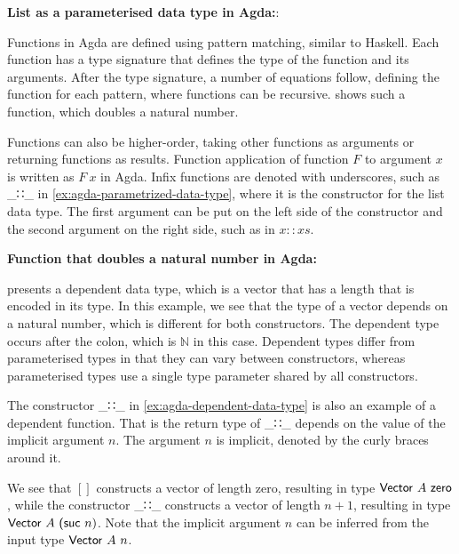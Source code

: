 \begin{example}
  \label{ex:agda-parametrized-data-type}
  \textbf{List as a parameterised data type in Agda:}:
  
\end{example}
Functions in Agda are defined using pattern matching, similar to Haskell. 
Each function has a type signature that defines the type of the function and its arguments.
After the type signature, a number of equations follow, defining the function for each pattern,
where functions can be recursive.  shows such a function, which doubles a natural number.

Functions can also be higher-order, taking other functions as arguments or returning functions as results.
Function application of function $F$ to argument $x$ is written as $F \ x$ in Agda.
Infix functions are denoted with underscores, such as \textsf{\_∷\_} in \cref{ex:agda-parametrized-data-type}, where it is the constructor for the list data type.
The first argument can be put on the left side of the constructor and the second argument on the right side, such as in $x :: xs$.

\begin{example}
  \label{ex:agda-function}
  \textbf{Function that doubles a natural number in Agda:}
  
\end{example}
 presents a dependent data type, which is a vector that has a length that is encoded in its type.
In this example, we see that the type of a vector depends on a natural number, which is different for both constructors.
The dependent type occurs after the colon, which is $\mathbb{N}$ in this case. 
Dependent types differ from parameterised types in that they can vary between constructors, whereas parameterised types use a single type parameter shared by all constructors.

The constructor \textsf{\_∷\_} in \cref{ex:agda-dependent-data-type} is also an example of a dependent function.
That is the return type of \textsf{\_∷\_} depends on the value of the implicit argument $n$. The argument $n$ is implicit, denoted by the curly braces around it.

We see that $[]$ constructs a vector of length zero, resulting in type $\mbox{\textsf{Vector} } A \mbox{ \textsf{zero}}$, 
while the constructor \textsf{\_∷\_} constructs a vector of length $n+1$, resulting in type $\mbox{\textsf{Vector }} A \mbox{ \textsf{(suc} } n)$.
Note that the implicit argument $n$ can be inferred from the input type $\mbox{\textsf{Vector} } A \ n$.

